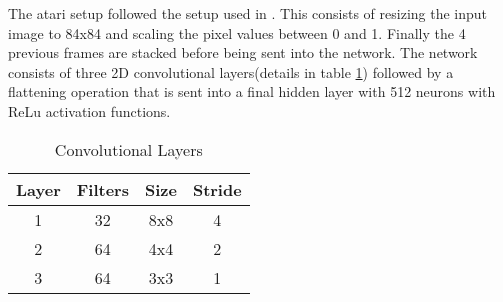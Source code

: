 {{The atari setup followed the setup used in \cite{mnih_2015}. This consists of resizing the input image to 84x84 and scaling the pixel values between 0 and 1. Finally the 4 previous frames are stacked before being sent into the network. The network consists of three 2D convolutional layers(details in table \ref{tb:conv_net}) followed by a flattening operation that is sent into a final hidden layer with 512 neurons with ReLu activation functions.

\begin{table}[H]
    \caption{Convolutional Layers}
    \label{tb:conv_net}
    \centering
    \begin{tabular}{@{}cccc@{}}
        \toprule
        Layer & Filters & Size & Stride \\ \midrule
        1 & 32 & 8x8 & 4 \\
        2 & 64 & 4x4 & 2 \\
        3 & 64 & 3x3 & 1 \\ \bottomrule
    \end{tabular}
\end{table}

}}
